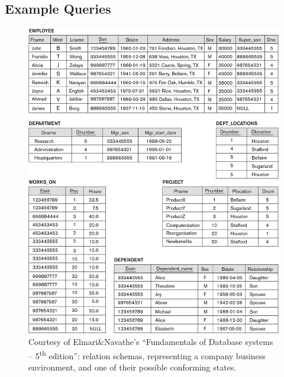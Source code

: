 \documentclass [a4paper, 12pt, twocolumn]{article}
\newcommand{\<}    {\langle}            %
\renewcommand{\>}  {\rangle}            %
\newcommand{\q}    {\quad}              %
\begin{document}

\subsection{Example Queries}

\begin{figure}
  \includegraphics[width=\textwidth]{schema.png}
  \caption{Courtesy of Elmari\&Navathe's ``Fundamentals of Database systems
    -- 5\textsuperscript{th} edition'': relation schemas, representing a
    company business environment, and one of their possible conforming
    states.}
  \label{fig:schema}
\end{figure}
\end{document}
